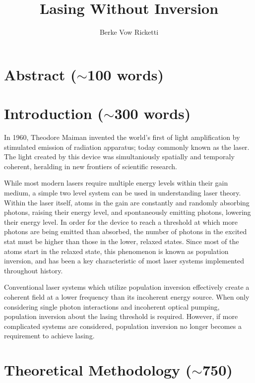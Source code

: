 \documentclass{article}
\title{Lasing Without Inversion}
\author{Berke Vow Ricketti}
\begin{document}
\maketitle{}




\section{Abstract ($\sim$100 words)}

\section{Introduction ($\sim$300 words)}

In 1960, Theodore Maiman invented the world's first of light amplification by stimulated emission of radiation apparatus; today commonly known as the laser. The light created by this device was simultaniously spatially and temporaly coherent, heralding in new frontiers of scientific research. 

While most modern lasers require multiple energy levels within their gain medium, a simple two level system can be used in understanding laser theory. Within the laser itself, atoms in the gain are constantly and randomly absorbing photons, raising their energy level, and spontaneously emitting photons, lowering their energy level. In order for the device to reach a threshold at which more photons are being emitted than absorbed, the number of photons in the excited stat must be higher than those in the lower, relaxed states. Since most of the atoms start in the relaxed state, this phenomenon is known as population inversion, and has been a key characteristic of most laser systems implemented throughout history.

Conventional laser systems which utilize population inversion effectively create a coherent field at a lower frequency than its incoherent energy source. When only considering single photon interactions and incoherent optical pumping, population inversion about the lasing threshold is required. However, if more complicated systems are considered, population inversion no longer becomes a requirement to achieve lasing.

\cite{Harris1989,Scully1994,Kocharovskaya1986,Mandel1993,Kilin2008,Ukhanov1999,Zhu1992,Marthaler2011,Mompart2000}
\section{Theoretical Methodology ($\sim$750)}
\end{document}
